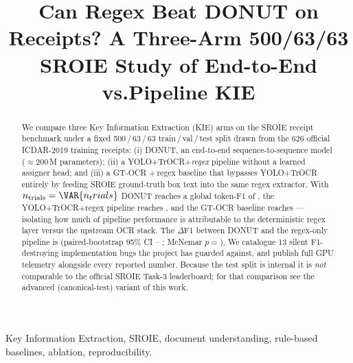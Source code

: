 \documentclass[conference]{IEEEtran}
\begin{document}
\title{Can Regex Beat DONUT on Receipts?
       A Three-Arm 500/63/63 SROIE Study of
       End-to-End vs.\@ Pipeline KIE}

\author{
}

\maketitle

\begin{IEEEkeywords}
Key Information Extraction, SROIE, document understanding,
rule-based baselines, ablation, reproducibility.
\end{IEEEkeywords}

\begin{abstract}
We compare three Key Information Extraction (KIE) arms on the SROIE
receipt benchmark under a fixed 500\,/\,63\,/\,63
train\,/\,val\,/\,test split drawn from the 626 official ICDAR-2019
training receipts: (i) DONUT, an end-to-end sequence-to-sequence
model ($\approx$200\,M parameters); (ii) a YOLO+TrOCR+\emph{regex}
pipeline without a learned assigner head; and (iii) a GT-OCR
$+$\,regex baseline that bypasses YOLO+TrOCR entirely by feeding
SROIE ground-truth box text into the same regex extractor.  With
$n_{\text{trials}}=\VAR{n_trials}$ DONUT reaches a global
token-F1 of , the YOLO+TrOCR+regex
pipeline reaches , and the GT-OCR
baseline reaches  —
isolating how much of pipeline performance is attributable to the
deterministic regex layer versus the upstream OCR stack.  The
$\Delta$F1 between DONUT and the regex-only pipeline is
 (paired-bootstrap 95\% CI --%
; McNemar $p=$).  We catalogue
13 silent F1-destroying implementation bugs the project has guarded
against, and publish full GPU telemetry alongside every reported
number.  Because the test split is internal it is \emph{not}
comparable to the official SROIE Task-3 leaderboard; for that
comparison see the advanced (canonical-test) variant of this work.
\end{abstract}



















\end{document}
